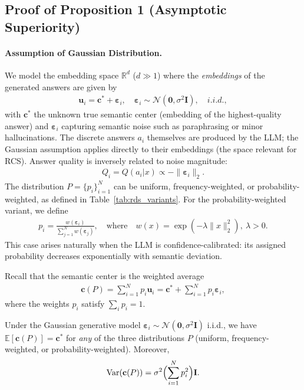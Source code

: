 \subsection{Proof of Proposition 1 (Asymptotic Superiority)}\label{app:proof_prop1}

\paragraph{Assumption of Gaussian Distribution.}
We model the embedding space \(\mathbb{R}^d\) (\(d \gg 1\)) where the \emph{embeddings} of the generated answers are given by
\begin{align}
\mathbf{u}_i = \mathbf{c}^* + \boldsymbol{\varepsilon}_i, \quad \boldsymbol{\varepsilon}_i \sim \mathcal{N}(\mathbf{0}, \sigma^2 \mathbf{I}), \quad i.i.d.,
\end{align}
with \(\mathbf{c}^*\) the unknown true semantic center (embedding of the highest-quality answer) and \(\boldsymbol{\varepsilon}_i\) capturing semantic noise such as paraphrasing or minor hallucinations. The discrete answers \(a_i\) themselves are produced by the LLM; the Gaussian assumption applies directly to their embeddings (the space relevant for RCS). Answer quality is inversely related to noise magnitude:
\begin{align}
Q_i = Q(a_i | x) \propto -\|\boldsymbol{\varepsilon}_i\|_2.
\end{align}
The distribution \(P{=}\{p_i\}_{i=1}^N\) can be uniform, frequency-weighted, or probability-weighted, as defined in Table~\ref{tab:rds_variants}. 
For the probability-weighted variant, we define
\begin{align}
p_i = \frac{w(\boldsymbol{\varepsilon}_i)}{\sum_{j=1}^N w(\boldsymbol{\varepsilon}_j)}, 
\quad \text{where} \quad 
w(x) = \exp(-\lambda \|x\|_2^2), \ \lambda > 0.
\end{align}
This case arises naturally when the LLM is confidence-calibrated: its assigned probability decreases exponentially with semantic deviation.

Recall that the semantic center is the weighted average
\begin{align}
\mathbf{c}(P) = \sum_{i=1}^N p_i \mathbf{u}_i 
= \mathbf{c}^* + \sum_{i=1}^N p_i \boldsymbol{\varepsilon}_i,
\end{align}
where the weights \(p_i\) satisfy \(\sum_i p_i = 1\).

Under the Gaussian generative model \(\boldsymbol{\varepsilon}_i \sim \mathcal{N}(\mathbf{0}, \sigma^2 \mathbf{I})\) i.i.d., we have \(\mathbb{E}[\mathbf{c}(P)] = \mathbf{c}^*\) for \emph{any} of the three distributions \(P\) (uniform, frequency-weighted, or probability-weighted). Moreover,
\begin{align}
\mathrm{Var}(\mathbf{c}(P)) = \sigma^2 \Bigl( \sum_{i=1}^N p_i^2 \Bigr) \mathbf{I}.
\end{align}

